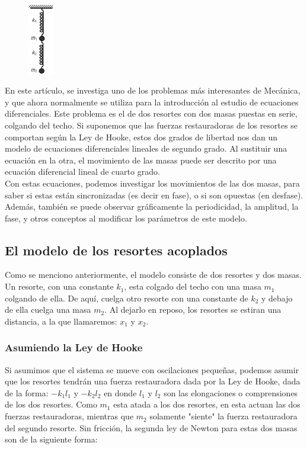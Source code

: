 \documentclass[12pt]{article}
\begin{document}
\begin{figure}
    \centering
    \includegraphics[width=0.1\textwidth]{ResorteAcoplado.png}
\end{figure}

En este artículo, se investiga uno de los problemas más interesantes de Mecánica, y que ahora normalmente se utiliza para la introducción al estudio de ecuaciones diferenciales. Este problema es el de dos resortes con dos masas puestas en serie, colgando del techo. Si suponemos que las fuerzas restauradoras de los resortes se comportan según la Ley de Hooke, estos dos grados de libertad nos dan un modelo de ecuaciones diferenciales lineales de segundo grado. Al sustituir una ecuación en la otra, el movimiento de las masas puede ser descrito por una ecuación diferencial lineal de cuarto grado.\\

Con estas ecuaciones, podemos investigar los movimientos de las dos masas, para saber si estas están sincronizadas (es decir en fase), o si son opuestas (en desfase). Además, también se puede observar gráficamente la periodicidad, la amplitud, la fase, y otros conceptos al modificar los parámetros de este modelo. 

\subsection{El modelo de los resortes acoplados}
Como se menciono anteriormente, el modelo consiste de dos resortes y dos masas. Un resorte, con una constante $k_1$, esta colgado del techo con una masa $m_1$ colgando de ella. De aquí, cuelga otro resorte con una constante de $k_2$ y debajo de ella cuelga una masa $m_2$.  Al dejarlo en reposo, los resortes se estiran una distancia, a la que llamaremos: $x_1$ y $x_2$. \\

\subsubsection{Asumiendo la Ley de Hooke}
Si asumimos que el sistema se mueve con oscilaciones pequeñas, podemos asumir que los resortes tendrán una fuerza restauradora dada por la Ley de Hooke, dada de la forma: $-k_1l_1$ y $-k_2l_2$ en donde $l_1$ y $l_2$ son las elongaciones o comprensiones de los dos resortes. Como $m_1$ esta atada a los dos resortes, en esta actuan las dos fuerzas restauradoras, mientras que $m_2$ solamente "siente" la fuerza restauradora del segundo resorte. Sin fricción, la segunda ley de Newton para estas dos masas son de la siguiente forma: \\
\end{document}
